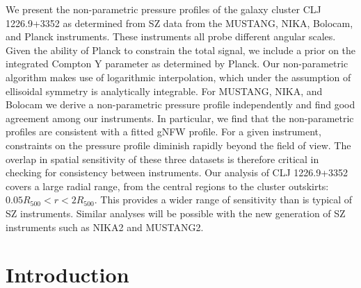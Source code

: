 \documentclass[twocolumn,traditabstract]{aa}
\begin{document}
\abstract
    {We present the non-parametric pressure profiles of the galaxy cluster CLJ 1226.9+3352 as
      determined from SZ data from the MUSTANG, NIKA, Bolocam, and Planck instruments.
      These instruments all probe different angular scales. Given the ability of Planck to
      constrain the total signal,
      we include a prior on the integrated Compton Y parameter as determined by Planck.
      Our non-parametric algorithm makes use of logarithmic interpolation, which under the assumption
      of ellisoidal symmetry is analytically integrable.
      For MUSTANG, NIKA, and Bolocam we derive a non-parametric pressure profile 
      independently and find good agreement among our instruments. In particular, we find
      that the non-parametric profiles are consistent with a fitted gNFW profile.
      For a given instrument,
      constraints on the pressure profile diminish rapidly beyond the field of view.
      The overlap in spatial sensitivity of these three datasets is therefore critical in checking
      for consistency between instruments. Our analysis of CLJ 1226.9+3352 
      covers a large radial range, from the central regions to the cluster outskirts:
      $0.05 R_{500} < r < 2 R_{500}$. This provides a wider range of sensitivity
      than is typical of SZ instruments. Similar analyses will be possible with the new generation
      of SZ instruments such as NIKA2 and MUSTANG2.}


\maketitle

\section{Introduction}
\label{sec:intro}
\end{document}
